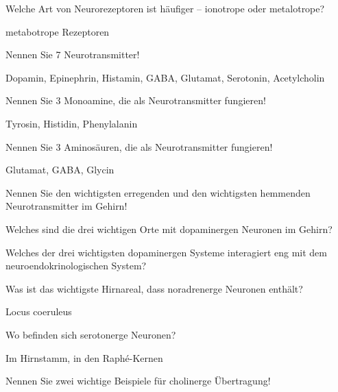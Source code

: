 \documentclass[10pt, a4paper]{exam}
\begin{document}
\begin{questions}
  \question Welche Art von Neurorezeptoren ist häufiger – ionotrope oder metalotrope?
  \begin{solution}
    metabotrope Rezeptoren
  \end{solution}

  \question Nennen Sie 7 Neurotransmitter!
  \begin{solution}
    Dopamin, Epinephrin, Histamin, GABA, Glutamat, Serotonin, Acetylcholin
  \end{solution}

  \question Nennen Sie 3 Monoamine, die als Neurotransmitter fungieren!
  \begin{solution}
    Tyrosin, Histidin, Phenylalanin
  \end{solution}

  \question Nennen Sie 3 Aminosäuren, die als Neurotransmitter fungieren!
  \begin{solution}
    Glutamat, GABA, Glycin
  \end{solution}

  \question Nennen Sie den wichtigsten erregenden und den wichtigsten hemmenden Neurotransmitter im Gehirn!
  \begin{solution}

  \end{solution}

  \question Welches sind die drei wichtigen Orte mit dopaminergen Neuronen im Gehirn?
  \begin{solution}

  \end{solution}

  \question Welches der drei wichtigsten dopaminergen Systeme interagiert eng mit dem neuroendokrinologischen System?
  \begin{solution}

  \end{solution}

  \question Was ist das wichtigste Hirnareal, dass noradrenerge Neuronen enthält?
  \begin{solution}
    Locus coeruleus
  \end{solution}

  \question Wo befinden sich serotonerge Neuronen?
  \begin{solution}
    Im Hirnstamm, in den Raphé-Kernen
  \end{solution}

  \question Nennen Sie zwei wichtige Beispiele für cholinerge Übertragung!
  \begin{solution}


\end{solution}
\end{questions}
\end{document}
